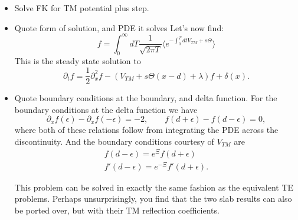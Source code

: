 \begin{itemize}
  \item {Solve FK for TM potential plus step. }
  \item Quote form of solution, and PDE it solves
    Let's now find: 
    \begin{equation}
      f = \int_0^\infty dT \frac{1}{\sqrt{2\pi T}}\langle e^{-\int_0^T dt V_{TM} + s\Theta}\rangle 
    \end{equation}
    This is the steady state solution to 
    \begin{equation}
      \partial_t f = \frac{1}{2}\partial_x^2f -(V_{TM} + s\Theta(x-d)+\lambda)f +\delta(x). 
    \end{equation}

  \item Quote boundary conditions at the boundary, and delta function.  
    For the boundary conditions at the delta function we have 
    \begin{equation}
      \partial_xf(\epsilon) -\partial_x f(-\epsilon) = -2 , \qquad f(d+\epsilon)-f(d-\epsilon) = 0,
    \end{equation}
    where both of these relations follow from integrating the PDE across the discontinuity.
    And the boundary conditions courtesy of $V_{TM}$ are
    \begin{align}
      f(d-\epsilon) = e^{\Xi}f(d+\epsilon)\\
      f'(d-\epsilon) = e^{-\Xi}f'(d+\epsilon).
    \end{align}

    This problem can be solved in exactly the same fashion as the equivalent TE problems.
    Perhaps unsurprisingly, you find that the two slab results can also be ported over, but with their TM reflection coefficients.  


\end{itemize}
